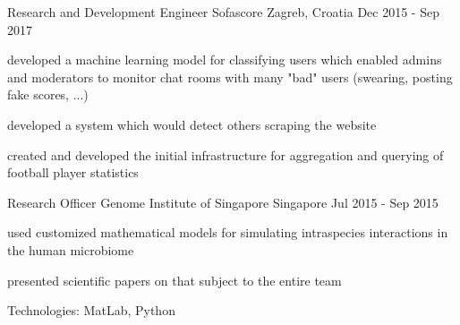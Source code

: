 \begin{cventries}
  \cventry
    {Research and Development Engineer} %
    {Sofascore} %
    {Zagreb, Croatia} %
    {Dec 2015 - Sep 2017} %
    {
      \begin{cvitems} %
        \item {developed a machine learning model for classifying users which enabled admins and moderators to monitor chat rooms with many "bad" users (swearing, posting fake scores, ...)}
        \item {developed a system which would detect others scraping the website}
        \item {created and developed the initial infrastructure for aggregation and querying of football player statistics}
      \end{cvitems}
    }

  \cventry
    {Research Officer} %
    {Genome Institute of Singapore} %
    {Singapore} %
    {Jul 2015 - Sep 2015} %
    {
      \begin{cvitems} %
        \item {used customized mathematical models for simulating intraspecies interactions in the human microbiome}
        \item {presented scientific papers on that subject to the entire team}
        \item {Technologies: MatLab, Python}
      \end{cvitems}
    }

\end{cventries}
